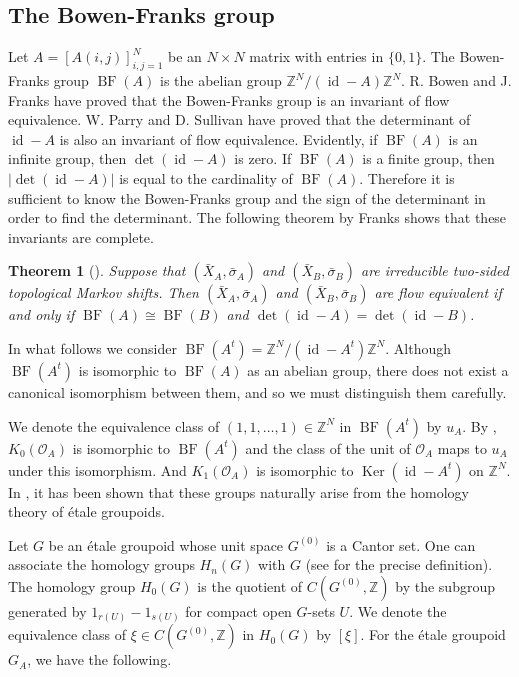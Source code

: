 \documentclass[11pt]{article}
\newtheorem{theorem}{Theorem}[section]
\theoremstyle{definition}
\numberwithin{equation}{section}
\newcommand{\BF}{\operatorname{BF}}
\newcommand{\id}{\operatorname{id}}
\newcommand{\Ker}{\operatorname{Ker}}
\newcommand{\Z}{\mathbb{Z}}
\begin{document}
\subsection{The Bowen-Franks group}




Let $A=[A(i,j)]_{i,j=1}^N$ be an $N\times N$ matrix with entries in $\{0,1\}$. 
The Bowen-Franks group $\BF(A)$ is the abelian group $\Z^N/(\id-A)\Z^N$. 
R. Bowen and J. Franks \cite{BF77Ann} have proved that 
the Bowen-Franks group is an invariant of flow equivalence. 
W. Parry and D. Sullivan \cite{PS75Top} have proved that 
the determinant of $\id-A$ is also an invariant of flow equivalence. 
Evidently, if $\BF(A)$ is an infinite group, then $\det(\id-A)$ is zero. 
If $\BF(A)$ is a finite group, 
then $\lvert\det(\id-A)\rvert$ is equal to the cardinality of $\BF(A)$. 
Therefore it is sufficient to know the Bowen-Franks group and 
the sign of the determinant in order to find the determinant. 
The following theorem by Franks shows that these invariants are complete. 

\begin{theorem}[{\cite{F84ETDS}}]\label{flow=BF}
Suppose that $(\bar X_A,\bar\sigma_A)$ and $(\bar X_B,\bar\sigma_B)$ are 
irreducible two-sided topological Markov shifts. 
Then 
$(\bar X_A,\bar\sigma_A)$ and $(\bar X_B,\bar\sigma_B)$ are flow equivalent 
if and only if 
$\BF(A)\cong\BF(B)$ and $\det(\id-A)=\det(\id-B)$. 
\end{theorem}

In what follows we consider $\BF(A^t)=\Z^N/(\id-A^t)\Z^N$. 
Although $\BF(A^t)$ is isomorphic to $\BF(A)$ as an abelian group, 
there does not exist a canonical isomorphism between them, 
and so we must distinguish them carefully. 

We denote the equivalence class of $(1,1,\dots,1)\in\Z^N$ in $\BF(A^t)$ 
by $u_A$. 
By \cite[Proposition 3.1]{C81Invent}, 
$K_0(\mathcal{O}_A)$ is isomorphic to $\BF(A^t)$ and 
the class of the unit of $\mathcal{O}_A$ maps to $u_A$ under this isomorphism. 
And $K_1(\mathcal{O}_A)$ is isomorphic to $\Ker(\id-A^t)$ on $\Z^N$. 
In \cite{Matui12PLMS}, 
it has been shown that these groups naturally arise 
from the homology theory of \'etale groupoids. 

Let $G$ be an \'etale groupoid whose unit space $G^{(0)}$ is a Cantor set. 
One can associate the homology groups $H_n(G)$ with $G$ 
(see \cite[Section 3]{Matui12PLMS} for the precise definition). 
The homology group $H_0(G)$ is the quotient of $C(G^{(0)},\Z)$ by the subgroup 
generated by $1_{r(U)}-1_{s(U)}$ for compact open $G$-sets $U$. 
We denote the equivalence class of $\xi\in C(G^{(0)},\Z)$ in $H_0(G)$ 
by $[\xi]$. 
For the \'etale groupoid $G_A$, we have the following. 
\end{document}
